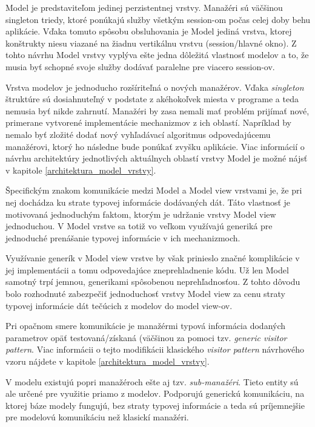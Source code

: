 Model je predstaviteľom jedinej perzistentnej  vrstvy. Manažéri sú väčšinou singleton triedy, ktoré ponúkajú služby všetkým session-om počas celej doby behu aplikácie. Vďaka tomuto spôsobu obsluhovania je Model jediná vrstva, ktorej konštrukty niesu viazané na žiadnu vertikálnu vrstvu (session/hlavné okno). Z tohto návrhu Model vrstvy vyplýva ešte jedna dôležitá vlastnosť modelov a to, že musia byť schopné svoje služby dodávať paralelne pre viacero session-ov. 

Vrstva modelov je jednoducho rozšíriteľná o nových manažérov. Vďaka \textit{singleton} štruktúre sú dosiahnuteľný v podstate z akéhokoľvek miesta v programe a teda nemusia byť nikde zahrnutí. Manažéri by zasa nemali mať problém prijímať nové, primerane vytvorené implementácie mechanizmov z ich oblastí. Napríklad by nemalo byť zložité dodať nový vyhľadávací algoritmus odpovedajúcemu manažérovi, ktorý ho následne bude ponúkať zvyšku aplikácie. Viac informácií o návrhu architektúry jednotlivých aktuálnych oblastí vrstvy Model je možné nájsť v kapitole \ref{architektura_model_vrstvy}.

Špecifickým znakom komunikácie medzi Model a Model view vrstvami je, že pri nej dochádza ku strate typovej informácie dodávaných dát. Táto vlastnosť je motivovaná jednoduchým faktom, ktorým je udržanie vrstvy Model view jednoduchou. V Model vrstve sa totiž vo veľkom využívajú generiká pre jednoduché prenášanie typovej informácie v ich mechanizmoch. 

Využívanie generík v Model view vrstve by však prinieslo značné komplikácie v jej implementácii a tomu odpovedajúce zneprehladnenie kódu. Už len Model samotný trpí jemnou, generikami spôsobenou neprehľadnosťou. Z tohto dôvodu bolo rozhodnuté zabezpečiť jednoduchosť vrstvy Model view za cenu straty typovej informácie dát tečúcich z modelov do model view-ov. 

Pri opačnom smere komunikácie je manažérmi typová informácia dodaných parametrov opäť testovaná/získaná (väčšinou za pomoci tzv. \textit{generic visitor pattern}. Viac informácii o tejto modifikácii klasického \textit{visitor pattern} návrhového vzoru nájdete v kapitole \ref{architektura_model_vrstvy}.

V modelu existujú popri manažéroch ešte aj tzv. \textit{sub-manažéri}. Tieto entity sú ale určené pre využitie priamo z modelov. Podporujú generickú komunikáciu, na ktorej báze modely fungujú, bez straty typovej informácie a teda sú príjemnejšie pre modelovú komunikáciu než klasickí manažéri.     

